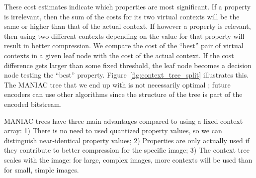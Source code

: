 \documentclass{article}
\begin{document}
These cost estimates indicate which properties are most significant.
If a property is irrelevant, then the sum of the costs for its two virtual contexts will be the same
or higher than that of the actual context. If however a property is relevant, then using two different
contexts depending on the value for that property will result in better compression.
We compare the cost of the ``best'' pair of virtual contexts in a given leaf node with the
cost of the actual context.
If the cost difference %
gets larger than some fixed
threshold, the leaf node becomes a decision node testing the ``best'' property.
Figure~\ref{fig:context_tree_split} illustrates this.
%
The MANIAC tree that we end up with is not necessarily optimal%
; future encoders can use other algorithms %
since the structure of the tree is part of the encoded bitstream.

MANIAC trees have three main advantages compared
to using a fixed context array:
1) There is no need to used quantized property values, so we can distinguish near-identical property values;
2) Properties are only actually used if they contribute to better compression for the specific image;
3) The context tree %
scales with the image:
for large, complex images, more contexts will be used than for small, simple images.
\end{document}
